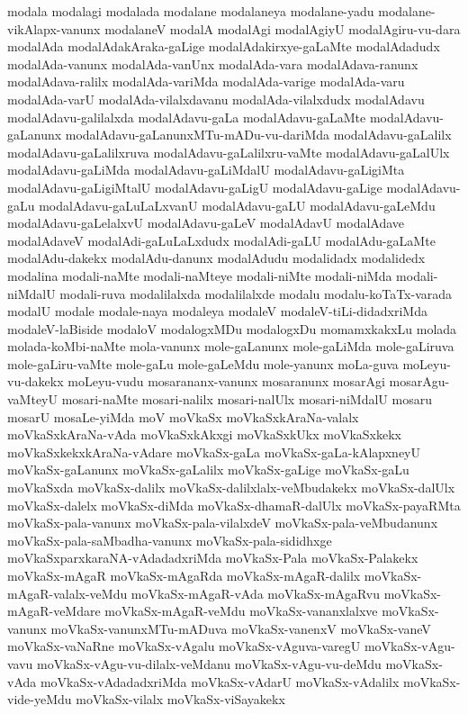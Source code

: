 {modala
modalagi
modalada
modalane
modalaneya
modalane-yadu
modalane-vikAlapx-vanunx
modalaneV
modalA
modalAgi
modalAgiyU
modalAgiru-vu-dara
modalAda
modalAdakAraka-gaLige
modalAdakirxye-gaLaMte
modalAdadudx
modalAda-vanunx
modalAda-vanUnx
modalAda-vara
modalAdava-ranunx
modalAdava-ralilx
modalAda-variMda
modalAda-varige
modalAda-varu
modalAda-varU
modalAda-vilalxdavanu
modalAda-vilalxdudx
modalAdavu
modalAdavu-galilalxda
modalAdavu-gaLa
modalAdavu-gaLaMte
modalAdavu-gaLanunx
modalAdavu-gaLanunxMTu-mADu-vu-dariMda
modalAdavu-gaLalilx
modalAdavu-gaLalilxruva
modalAdavu-gaLalilxru-vaMte
modalAdavu-gaLalUlx
modalAdavu-gaLiMda
modalAdavu-gaLiMdalU
modalAdavu-gaLigiMta
modalAdavu-gaLigiMtalU
modalAdavu-gaLigU
modalAdavu-gaLige
modalAdavu-gaLu
modalAdavu-gaLuLaLxvanU
modalAdavu-gaLU
modalAdavu-gaLeMdu
modalAdavu-gaLelalxvU
modalAdavu-gaLeV
modalAdavU
modalAdave
modalAdaveV
modalAdi-gaLuLaLxdudx
modalAdi-gaLU
modalAdu-gaLaMte
modalAdu-dakekx
modalAdu-danunx
modalAdudu
modalidadx
modalidedx
modalina
modali-naMte
modali-naMteye
modali-niMte
modali-niMda
modali-niMdalU
modali-ruva
modalilalxda
modalilalxde
modalu
modalu-koTaTx-varada
modalU
modale
modale-naya
modaleya
modaleV
modaleV-tiLi-didadxriMda
modaleV-laBiside
modaloV
modalogxMDu
modalogxDu
momamxkakxLu
molada
molada-koMbi-naMte
mola-vanunx
mole-gaLanunx
mole-gaLiMda
mole-gaLiruva
mole-gaLiru-vaMte
mole-gaLu
mole-gaLeMdu
mole-yanunx
moLa-guva
moLeyu-vu-dakekx
moLeyu-vudu
mosarananx-vanunx
mosaranunx
mosarAgi
mosarAgu-vaMteyU
mosari-naMte
mosari-nalilx
mosari-nalUlx
mosari-niMdalU
mosaru
mosarU
mosaLe-yiMda
moV
moVkaSx
moVkaSxkAraNa-valalx
moVkaSxkAraNa-vAda
moVkaSxkAkxgi
moVkaSxkUkx
moVkaSxkekx
moVkaSxkekxkAraNa-vAdare
moVkaSx-gaLa
moVkaSx-gaLa-kAlapxneyU
moVkaSx-gaLanunx
moVkaSx-gaLalilx
moVkaSx-gaLige
moVkaSx-gaLu
moVkaSxda
moVkaSx-dalilx
moVkaSx-dalilxlalx-veMbudakekx
moVkaSx-dalUlx
moVkaSx-dalelx
moVkaSx-diMda
moVkaSx-dhamaR-dalUlx
moVkaSx-payaRMta
moVkaSx-pala-vanunx
moVkaSx-pala-vilalxdeV
moVkaSx-pala-veMbudanunx
moVkaSx-pala-saMbadha-vanunx
moVkaSx-pala-sididhxge
moVkaSxparxkaraNA-vAdadadxriMda
moVkaSx-Pala
moVkaSx-Palakekx
moVkaSx-mAgaR
moVkaSx-mAgaRda
moVkaSx-mAgaR-dalilx
moVkaSx-mAgaR-valalx-veMdu
moVkaSx-mAgaR-vAda
moVkaSx-mAgaRvu
moVkaSx-mAgaR-veMdare
moVkaSx-mAgaR-veMdu
moVkaSx-vananxlalxve
moVkaSx-vanunx
moVkaSx-vanunxMTu-mADuva
moVkaSx-vanenxV
moVkaSx-vaneV
moVkaSx-vaNaRne
moVkaSx-vAgalu
moVkaSx-vAguva-varegU
moVkaSx-vAgu-vavu
moVkaSx-vAgu-vu-dilalx-veMdanu
moVkaSx-vAgu-vu-deMdu
moVkaSx-vAda
moVkaSx-vAdadadxriMda
moVkaSx-vAdarU
moVkaSx-vAdalilx
moVkaSx-vide-yeMdu
moVkaSx-vilalx
moVkaSx-viSayakekx
}
